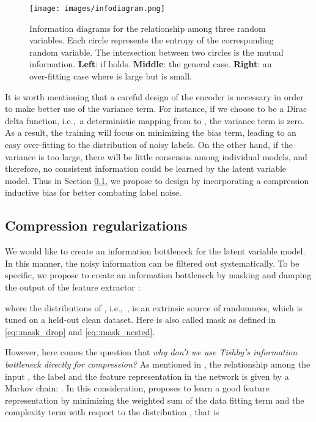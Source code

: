 \documentclass[journal]{IEEEtran}
\begin{document}
\begin{figure}[t]
	\begin{minipage}[t]{0.45\textwidth}  
		\centering  
		\texttt{[image: images/infodiagram.png]}
	\end{minipage}  
	\centering  
	\caption{Information diagrams for the relationship among three random variables.
	Each circle represents the entropy of the corresponding random variable. The intersection between two circles is the mutual information.
	\textbf{Left}: if  holds. \textbf{Middle}: the general case. \textbf{Right}: an over-fitting case where  is large but  is small.}
	\label{fig::infodiagram}
	\vspace{-3mm}
\end{figure}
It is worth mentioning that a careful design of the encoder  is necessary in order to make better use of the variance term.
For instance, if we choose  to be a Dirac delta function, i.e.,~a deterministic mapping from  to , the variance term is zero.
As a result, the training will focus on minimizing the bias term, leading to an easy over-fitting to the distribution of noisy labels.
On the other hand, if the variance is too large, there will be little consensus among individual models, and therefore, no consistent information could be learned by the latent variable model.
Thus in Section \ref{subsec::compression}, we propose to design  by incorporating a compression inductive bias for better combating label noise.




\subsection{Compression regularizations} \label{subsec::compression}
We would like to create an information bottleneck for the latent variable model. 
In this manner, the noisy information can be filtered out systematically.
To be specific, we propose to create an information bottleneck by masking and damping the output of the feature extractor :

where the distributions of , i.e.,~, is an extrinsic source of randomness, which is tuned on a held-out clean dataset.
Here  is also called mask as defined in \eqref{eq::mask_drop} and \eqref{eq::mask_nested}.

However, here comes the question that \textit{why don't we use Tishby's information bottleneck \cite{tishby2000information} directly for compression?}
As mentioned in \cite{tishby2000information}, the relationship among the input , the label  and the feature representation  in the network is given by a Markov chain:
.
In this consideration, \cite{tishby2000information} proposes to learn a good feature representation by minimizing the weighted sum of the data fitting term  and the complexity term  with respect to the distribution , that is
\end{document}

